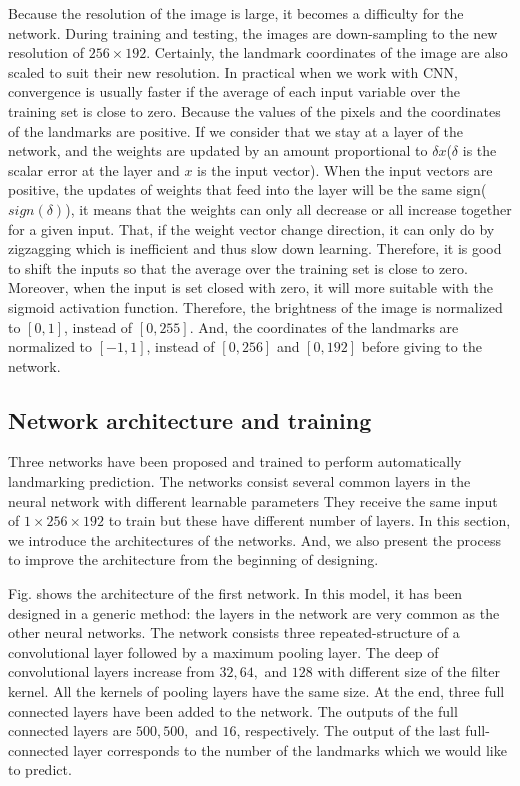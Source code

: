 \documentclass[conference]{IEEEtran}
\begin{document}
Because the resolution of the image is large, it becomes a difficulty for the network. During training and testing, the images are down-sampling to the new resolution of $256 \times 192$. Certainly, the landmark coordinates of the image are also scaled to suit their new resolution. In practical when we work with CNN, convergence is usually faster if the average of each input variable over the training set is close to zero. Because the values of the pixels and the coordinates of the landmarks are positive. If we consider that we stay at a layer of the network, and the weights are updated by an amount proportional to $\delta x$($\delta$ is the scalar error at the layer and $x$ is the input vector). When the input vectors are positive, the updates of weights that feed into the layer will be the same sign($sign(\delta)$), it means that the weights can only all decrease or all increase together for a given input. That, if the weight vector change direction, it can only do by zigzagging which is inefficient and thus slow down learning. Therefore, it is good to shift the inputs so that the average over the training set is close to zero. Moreover, when the input is set closed with zero, it will more suitable with the sigmoid activation function\cite{lecun2012efficient}. Therefore, the brightness of the image is normalized to $[0,1]$, instead of $[0,255]$. And, the coordinates of the landmarks are normalized to $[-1,1]$, instead of $[0,256]$ and $[0,192]$ before giving to the network.
\subsection{Network architecture and training}
Three networks have been proposed and trained to perform automatically landmarking prediction. The networks consist several common layers in the neural network with different learnable parameters They receive the same input of $1 \times 256 \times 192$ to train but these have different number of layers. In this section, we introduce the architectures of the networks. And, we also present the process to improve the architecture from the beginning of designing.

Fig. shows the architecture of the first network. In this model, it has been designed in a generic method: the layers in the network are very common as the other neural networks. The network consists three repeated-structure of a convolutional layer followed by a maximum pooling layer. The deep of convolutional layers increase from $32, 64,$ and $128$ with different size of the filter kernel. All the kernels of pooling layers have the same size.  At the end, three full connected layers have been added to the network. The outputs of the full connected layers are $500, 500,$ and $16$, respectively. The output of the last full-connected layer corresponds to the number of the landmarks which we would like to predict.
\end{document}

